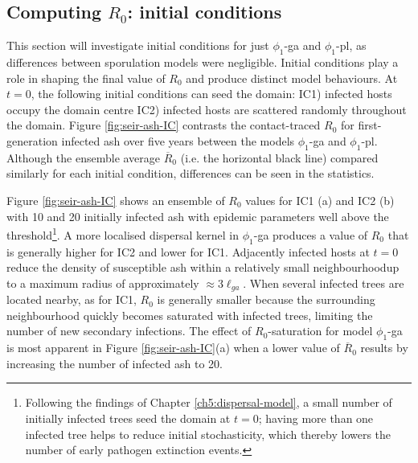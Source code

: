 \subsection{Computing $R_0$: initial conditions}

\label{section:initial-conditions}

This section will investigate initial conditions for just $\phi_1$-ga and $\phi_1$-pl, 
as differences between sporulation models were negligible. Initial conditions play a role in shaping the final value of $R_0$ and produce distinct model behaviours. At $t=0$, the following initial conditions can seed the domain:  
IC1) infected hosts occupy the domain centre  
IC2) infected hosts are scattered randomly throughout the domain.
Figure \ref{fig:seir-ash-IC} contrasts the contact-traced $R_0$ for 
first-generation infected ash over five years between the models $\phi_1$-ga and $\phi_1$-pl.
Although the ensemble average $\overline{R}_0$ (i.e. the horizontal black line) compared similarly 
for each initial condition, differences can be seen in the statistics.

Figure \ref{fig:seir-ash-IC} shows an ensemble of $R_0$ values for IC1 (a) and IC2 (b) with 10 and 20 initially infected ash with epidemic parameters well above the threshold\footnote{
Following the findings of Chapter \ref{ch5:dispersal-model}, a small number of initially infected trees seed 
the domain at $t=0$; having more than one infected tree helps to reduce initial stochasticity, 
which thereby lowers the number of early pathogen extinction events.}.
A more localised dispersal kernel in $\phi_1$-ga produces a value of $R_0$ that is generally higher for IC2 and lower for IC1.
Adjacently infected hosts at $t=0$ reduce the density of susceptible ash within a relatively small 
neighbourhood\textemdash up to a maximum radius of approximately $\approx 3\ell_{ga}$.
When several infected trees are located nearby, as for IC1, $R_0$ is generally smaller because the
surrounding neighbourhood quickly becomes saturated with infected trees, limiting the number of new secondary infections.
The effect of $R_0$-saturation for model $\phi_1$-ga is most apparent in Figure \ref{fig:seir-ash-IC}(a) 
when a lower value of $\overline{R}_0$ results by increasing the number of infected ash to 20.

